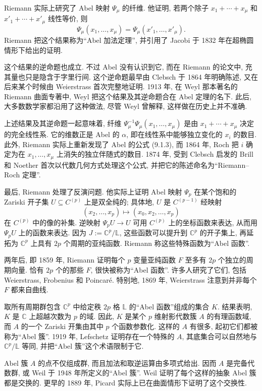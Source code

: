 Riemann 实际上研究了 Abel 映射 $\Psi_\mu$ 的纤维. 他证明, 若两个除子 $x_1+\cdots+x_\mu$ 和 $x'_1+\cdots+x'_\mu$ 线性等价, 则
\[
\Psi_\mu(x_1,\ldots,x_\mu)=\Psi_\mu(x'_1,\ldots,x'_\mu).
\]
Riemann 把这个结果称为“Abel 加法定理”, 并引用了 Jacobi 于 1832 年在超椭圆情形下给出的证明.

这个结果的逆命题也成立. 不过 Abel 没有认识到它, 而在 Riemann 的论文中, 充其量也只是隐含于字里行间. 这个逆命题最早由
Clebsch 于 1864 年明确陈述, 又在后来某个时候由 Weierstrass 首次完整地证明. 1913 年, 在 Weyl 那本著名的 Riemann 曲面专著中, Weyl 把这个结果及其逆命题合在 Abel 定理的名下. 此后, 大多数数学家都沿用了这种做法, 尽管 Weyl 曾解释, 这样做在历史上并不准确.

上述结果及其逆命题一起意味着, 纤维 $\Psi_\mu^{-1}\Psi_\mu(x_1,\ldots,x_\mu)$ 是由 $x_1+\cdots+x_\mu$ 决定的完全线性系. 它的维数正是 Abel 的 $\alpha$, 即在线性系中能够独立变化的 $x_i$ 的数目. 此外, Riemann 实际上重新发现了 Abel 的公式 (9.1.3), 而 1864 年, Roch 把 $i$ 确定为在 $x_1,\ldots,x_\mu$ 上消失的独立伴随式的数目. 1874 年, 受到 Clebsch 启发的 Brill 和 Noether 首次以代数几何方式处理这个公式, 并把它的陈述命名为“Riemann--Roch 定理”.

最后, Riemann 处理了反演问题. 他实际上证明 Abel 映射 $\Psi_p$ 在某个饱和的 Zariski 开子集 $U\subseteq C^{(p)}$ 上是双全纯的; 具体地, $U$ 是 $C^{(p-1)}$ 经映射
\[
(x_2,\ldots,x_p)\longmapsto(x_0,x_2,\ldots,x_p)
\]
在 $C^{(p)}$ 中的像的补集. 逆映射 $\Psi_pU\to U$ 可用 $C^{(p)}$ 上的坐标函数来表达, 从而用 $\Psi_pU$ 上的函数来表达. 因为 $J:=\mathbb C^p/\mathbb L$, 这些函数可以提升到 $\mathbb C^p$ 的开子集上, 再延拓为 $\mathbb C^p$ 上具有 $2p$ 个周期的亚纯函数. Riemann 称这些特殊函数为“Abel 函数”.

两年后, 即 1859 年, Riemann 证明每个 $p$ 变量亚纯函数 $F$ 至多有 $2p$ 个独立的周期向量. 恰有 $2p$ 个的那些 $F$, 很快被称为“Abel 函数”. 许多人研究了它们, 包括 Weierstrass, Frobenius 和 Poincaré. 特别地, 1869 年, Weierstrass 注意到并非每个 $F$ 都来自曲线.

取所有周期群包含 $\mathbb C^p$ 中给定秩 $2p$ 格 $\mathbb L$ 的“Abel 函数”组成的集合 $K$. 结果表明, $K$ 是 $\mathbb C$ 上超越次数为 $p$ 的域. 因此, $K$ 是某个 $p$ 维射影代数簇 $A$ 的有理函数域, 而 $A$ 的一个 Zariski 开集由其中 $p$ 个函数参数化. 这样的 $A$ 有很多, 起初它们都被称为“Abel 簇”. 1919 年, Lefschetz 证明存在一个特殊的 $A$, 其底集合可以自然地与 $\mathbb C^p/\mathbb L$ 等同, 并把“Abel 簇”这个术语限制于它.

Abel 簇 $A$ 的点不仅组成群, 而且加法和取逆运算由多项式给出. 因而 $A$ 是完备代数群, 或 Weil 于 1948 年所定义的“Abel 簇”. Weil 证明了每个这样的抽象 Abel 簇都是交换的. 更早的 1889 年, Picard 实际上已在曲面情形下证明了这个交换性.

